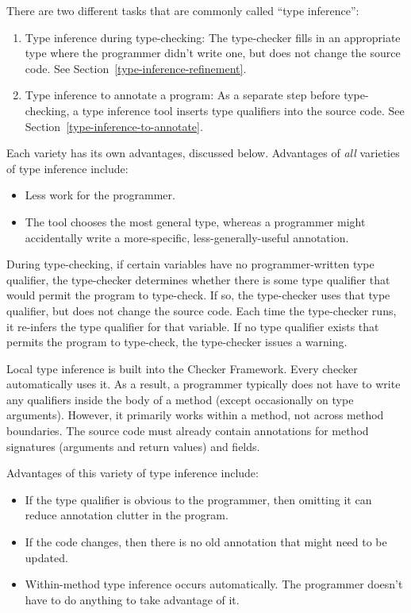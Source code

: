 \htmlhr
{}

There are two different tasks that are commonly called ``type inference'':
\begin{enumerate}
\item
  Type inference during type-checking:
  The type-checker fills in an appropriate type where the programmer didn't
  write one, but does not change the source code.
  See Section~\ref{type-inference-refinement}.
\item
  Type inference to annotate a program:
  As a separate step before type-checking, a type inference tool
  inserts type qualifiers into the source code.
  See Section~\ref{type-inference-to-annotate}.
\end{enumerate}

Each variety has its own advantages, discussed below.
Advantages of \emph{all} varieties of type inference include:
\begin{itemize}
\item
  Less work for the programmer.
\item
  The tool chooses the most general type, whereas a programmer might
  accidentally write a more-specific, less-generally-useful annotation.
\end{itemize}



During type-checking, if certain variables have no programmer-written type qualifier, the
type-checker determines whether there is some type qualifier that would
permit the program to type-check.  If so, the type-checker uses that type
qualifier, but does not change the source code.  Each time the
type-checker runs, it re-infers the type qualifier for that variable.  If
no type qualifier exists that permits the program to type-check, the
type-checker issues a warning.

Local type inference is built into the Checker Framework.
Every checker automatically uses it.  As a result, a programmer typically
does not have to write any qualifiers inside the body of a method
(except occasionally on type arguments).
However, it primarily
works within a method, not across method boundaries.
The source code must already contain annotations for method
signatures (arguments and return values) and fields.

Advantages of this variety of type inference include:
\begin{itemize}
\item
  If the type qualifier is obvious to the programmer, then omitting it
  can reduce annotation clutter in the program.
\item
  If the code changes, then there is no old annotation that
  might need to be updated.
\item
  Within-method type inference occurs automatically.
  The programmer doesn't have to do anything to take advantage of it.
\end{itemize}

